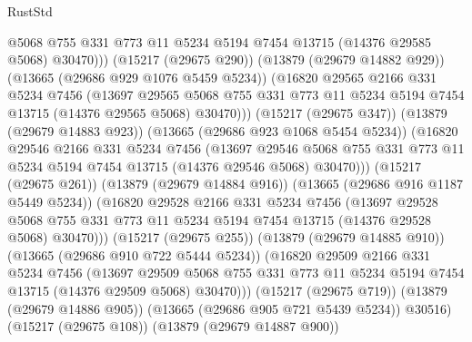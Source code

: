 \begin{lexlean}{RustStd}
\begin{coremodule}
                    @5068
                    @755
                    @331
                    @773
                    @11
                    @5234
                    @5194
                    @7454
                    @13715
                    (@14376 @29585 @5068)
                    @30470)))
              (@15217 (@29675 @290))
              (@13879 (@29679 @14882 @929))
              (@13665 (@29686 @929 @1076 @5459 @5234))
              (@16820
                @29565
                @2166
                @331
                @5234
                @7456
                (@13697
                  @29565
                  @5068
                  @755
                  @331
                  @773
                  @11
                  @5234
                  @5194
                  @7454
                  @13715
                  (@14376 @29565 @5068)
                  @30470)))
            (@15217 (@29675 @347))
            (@13879 (@29679 @14883 @923))
            (@13665 (@29686 @923 @1068 @5454 @5234))
            (@16820
              @29546
              @2166
              @331
              @5234
              @7456
              (@13697
                @29546
                @5068
                @755
                @331
                @773
                @11
                @5234
                @5194
                @7454
                @13715
                (@14376 @29546 @5068)
                @30470)))
          (@15217 (@29675 @261))
          (@13879 (@29679 @14884 @916))
          (@13665 (@29686 @916 @1187 @5449 @5234))
          (@16820
            @29528
            @2166
            @331
            @5234
            @7456
            (@13697
              @29528
              @5068
              @755
              @331
              @773
              @11
              @5234
              @5194
              @7454
              @13715
              (@14376 @29528 @5068)
              @30470)))
        (@15217 (@29675 @255))
        (@13879 (@29679 @14885 @910))
        (@13665 (@29686 @910 @722 @5444 @5234))
        (@16820
          @29509
          @2166
          @331
          @5234
          @7456
          (@13697
            @29509
            @5068
            @755
            @331
            @773
            @11
            @5234
            @5194
            @7454
            @13715
            (@14376 @29509 @5068)
            @30470)))
      (@15217 (@29675 @719))
      (@13879 (@29679 @14886 @905))
      (@13665 (@29686 @905 @721 @5439 @5234))
      @30516)
    (@15217 (@29675 @108))
    (@13879 (@29679 @14887 @900))

\end{coremodule}
\end{lexlean}
